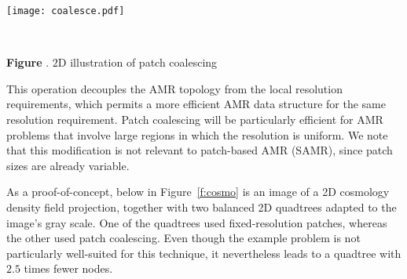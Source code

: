 \documentclass[11pt,letterpaper]{article}
\newcounter{figctr}
\newcommand{\FIGURE}[3]{
\noindent
\parbox{\textwidth}{
\begin{center}
#3
\end{center}%
\ \nolinebreak%
\refstepcounter{figctr}%
\begin{center}%
\begin{minipage}{7.0in}
\textbf{Figure \thefigctr}. #1
\end{minipage}
\end{center}
\label{#2}
}}
\begin{document}

\FIGURE{$2$D illustration of patch coalescing}{f:coalesce}{
\begin{minipage}{3.75in}
\texttt{[image: coalesce.pdf]}
\end{minipage}}


This operation decouples the AMR topology from the local resolution
requirements, which permits a more efficient AMR data structure for
the same resolution requirement.  Patch coalescing will be
particularly efficient for AMR problems that involve large regions in
which the resolution is uniform.  We note that this modification is
not relevant to patch-based AMR (SAMR), since patch sizes are already
variable.

As a proof-of-concept, below in Figure~\ref{f:cosmo} is an image of a
2D cosmology density field projection, together with two balanced 2D
quadtrees adapted to the image's gray scale.  One of the quadtrees
used fixed-resolution patches, whereas the other used patch
coalescing.  Even though the example problem is not particularly
well-suited for this technique, it nevertheless leads to a quadtree
with $2.5$ times fewer nodes.

\end{document}

